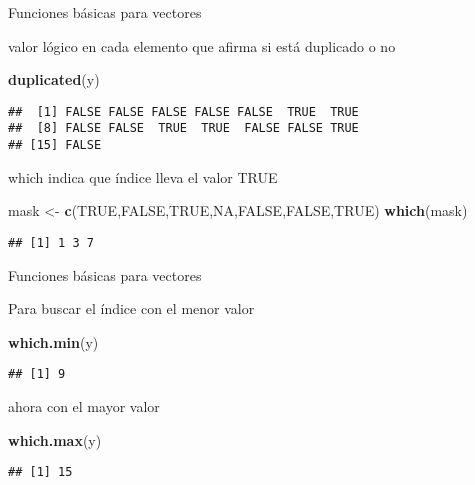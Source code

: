 \documentclass[ignorenonframetext,]{beamer}
\newenvironment{Shaded}{\begin{snugshade}}{\end{snugshade}}
\newcommand{\KeywordTok}[1]{\textcolor[rgb]{0.13,0.29,0.53}{\textbf{#1}}}
\newcommand{\StringTok}[1]{\textcolor[rgb]{0.31,0.60,0.02}{#1}}
\newcommand{\OtherTok}[1]{\textcolor[rgb]{0.56,0.35,0.01}{#1}}
\newcommand{\NormalTok}[1]{#1}
\begin{document}
\begin{frame}[fragile]{Funciones básicas para vectores}

valor lógico en cada elemento que afirma si está duplicado o no

\begin{Shaded}
\begin{Highlighting}[]
\KeywordTok{duplicated}\NormalTok{(y)}
\end{Highlighting}
\end{Shaded}

\begin{verbatim}
##  [1] FALSE FALSE FALSE FALSE FALSE  TRUE  TRUE
##  [8] FALSE FALSE  TRUE  TRUE  FALSE FALSE TRUE 
## [15] FALSE
\end{verbatim}

which indica que índice lleva el valor TRUE

\begin{Shaded}
\begin{Highlighting}[]
\NormalTok{mask <-}\StringTok{ }\KeywordTok{c}\NormalTok{(}\OtherTok{TRUE}\NormalTok{,}\OtherTok{FALSE}\NormalTok{,}\OtherTok{TRUE}\NormalTok{,}\OtherTok{NA}\NormalTok{,}\OtherTok{FALSE}\NormalTok{,}\OtherTok{FALSE}\NormalTok{,}\OtherTok{TRUE}\NormalTok{)}
\KeywordTok{which}\NormalTok{(mask)}
\end{Highlighting}
\end{Shaded}

\begin{verbatim}
## [1] 1 3 7
\end{verbatim}

\end{frame}

\begin{frame}[fragile]{Funciones básicas para vectores}

Para buscar el índice con el menor valor

\begin{Shaded}
\begin{Highlighting}[]
\KeywordTok{which.min}\NormalTok{(y)}
\end{Highlighting}
\end{Shaded}

\begin{verbatim}
## [1] 9
\end{verbatim}

ahora con el mayor valor

\begin{Shaded}
\begin{Highlighting}[]
\KeywordTok{which.max}\NormalTok{(y)}
\end{Highlighting}
\end{Shaded}

\begin{verbatim}
## [1] 15
\end{verbatim}

\end{frame}
\end{document}
